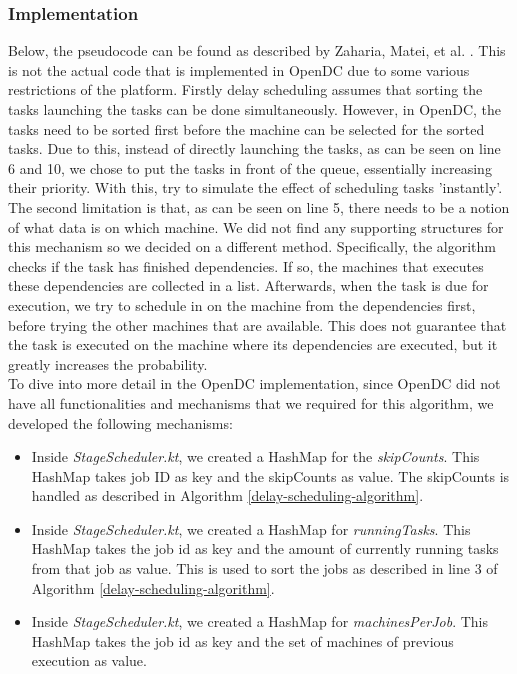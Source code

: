 \documentclass{article}
\begin{document}
\subsubsection{Implementation}\label{delay-scheduling-implementation}
Below, the pseudocode can be found as described by Zaharia, Matei, et al. \cite{zaharia2010delay}. This is not the actual code that is implemented in OpenDC due to some various restrictions of the platform. 
Firstly delay scheduling assumes that sorting the tasks launching the tasks can be done simultaneously. However, in OpenDC, the tasks need to be sorted first before the machine can be selected for the sorted tasks. Due to this, instead of directly launching the tasks, as can be seen on line 6 and 10, we chose to put the tasks in front of the queue, essentially increasing their priority. With this, try to simulate the effect of scheduling tasks 'instantly'. The second limitation is that, as can be seen on line 5, there needs to be a notion of what data is on which machine. We did not find any supporting structures for this mechanism so we decided on a different method. Specifically, the algorithm checks if the task has finished dependencies. If so, the machines that executes these dependencies are collected in a list. Afterwards, when the task is due for execution, we try to schedule in on the machine from the dependencies first, before trying the other machines that are available. This does not guarantee that the task is executed on the machine where its dependencies are executed, but it greatly increases the probability.
\\
To dive into more detail in the OpenDC implementation, since OpenDC did not have all functionalities and mechanisms that we required for this algorithm, we developed the following mechanisms: 
\begin{itemize}
    \item Inside \textit{StageScheduler.kt}, we created a HashMap for the \textit{skipCounts}. This HashMap takes job ID as key and the skipCounts as value. The skipCounts is handled as described in Algorithm \ref{delay-scheduling-algorithm}.
    \item Inside \textit{StageScheduler.kt}, we created a HashMap for \textit{runningTasks}. This HashMap takes the job id as key and the amount of currently running tasks from that job as value. This is used to sort the jobs as described in line 3 of Algorithm \ref{delay-scheduling-algorithm}.
    \item Inside \textit{StageScheduler.kt}, we created a HashMap for \textit{machinesPerJob}. This HashMap takes the job id as key and the set of machines of previous execution as value. 
\end{itemize}
\end{document}
